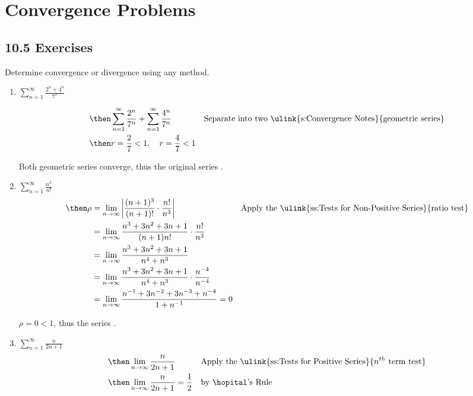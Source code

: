 \newpage %

\section{Convergence Problems}

\subsection{10.5 Exercises}
Determine convergence or divergence using any method.
\vspace{1em}
\begin{enumerate}[itemsep=12em]
  \item \(\displaystyle \sum_{n=1}^{\infty} \frac{2^n + 4^n }{7^n}\)

    \begin{align*}
      &\then
      \sum_{n=1}^{\infty} \frac{2^n}{7^n} +
      \sum_{n=1}^{\infty} \frac{4^n }{7^n}
      && \text{Separate into two \ulink{s:Convergence Notes}{geometric series}} \\
      &\then
      r = \frac{2}{7} < 1, \quad r = \frac{4}{7} < 1
    \end{align*}

    Both geometric series converge, thus the original series .

  \item \(\displaystyle \sum_{n=1}^{\infty} \frac{n^3}{n!} \)
    \begin{align*}
      \then \rho &= \lim_{n \to \infty} \left| \frac{(n+1)^3}{(n+1)!} \cdot
      \frac{n!}{n^3} \right|
      && \text{Apply the \ulink{ss:Tests for Non-Positive Series}{ratio test}} \\
       &= \lim_{n \to \infty} \frac{n^3 + 3n^2 + 3n + 1}{(n+1)n!} \cdot
      \frac{n!}{n^3} \\
       &= \lim_{n \to \infty} \frac{n^3 + 3n^2 + 3n + 1}{n^4+n^3} \\
       &= \lim_{n \to \infty} \frac{n^3 + 3n^2 + 3n + 1}{n^4+n^3} \cdot \frac{n^{-4}}{n^{-4}}\\
       &= \lim_{n \to \infty} \frac{n^{-1}  + 3n^{-2} + 3n^{-3}  + n^{-4} }{1+n^{-1} } = 0
    \end{align*}

    \(\rho = 0 < 1\), thus the series .

  \item \(\displaystyle \sum_{n=1}^{\infty} \frac{n}{2n+1} \)
    \begin{align*}
      &\then \lim_{n \to \infty} \frac{n}{2n+1}
      && \text{Apply the \ulink{ss:Tests for Positive Series}{\(n^{th} \) term test}} \\
      &\then \lim_{n \to \infty} \frac{n}{2n+1} = \frac{1}{2}
      && \text{by \hopital's Rule}
    \end{align*}


\end{enumerate}
